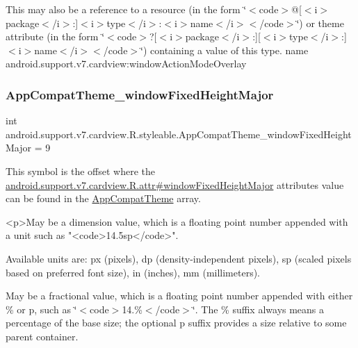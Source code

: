 This may also be a reference to a resource (in the form \char`\"{}$<$code$>$@\mbox{[}$<$i$>$package$<$/i$>$\+:\mbox{]}$<$i$>$type$<$/i$>$\+:$<$i$>$name$<$/i$>$$<$/code$>$\char`\"{}) or theme attribute (in the form \char`\"{}$<$code$>$?\mbox{[}$<$i$>$package$<$/i$>$\+:\mbox{]}\mbox{[}$<$i$>$type$<$/i$>$\+:\mbox{]}$<$i$>$name$<$/i$>$$<$/code$>$\char`\"{}) containing a value of this type.  name android.\+support.\+v7.\+cardview\+:window\+Action\+Mode\+Overlay \mbox{\label{classandroid_1_1support_1_1v7_1_1cardview_1_1R_1_1styleable_af7d8d8ae32e20793c811cd2892bd854b}} 
\subsubsection{\texorpdfstring{App\+Compat\+Theme\+\_\+window\+Fixed\+Height\+Major}{AppCompatTheme\_windowFixedHeightMajor}}
{\footnotesize\ttfamily int android.\+support.\+v7.\+cardview.\+R.\+styleable.\+App\+Compat\+Theme\+\_\+window\+Fixed\+Height\+Major = 9\hspace{0.3cm}{\ttfamily [static]}}

This symbol is the offset where the \hyperlink{classandroid_1_1support_1_1v7_1_1cardview_1_1R_1_1attr_a60358e25c5caa9936e1ff906a18e2212}{android.\+support.\+v7.\+cardview.\+R.\+attr\#window\+Fixed\+Height\+Major} attribute\textquotesingle{}s value can be found in the \hyperlink{classandroid_1_1support_1_1v7_1_1cardview_1_1R_1_1styleable_a52e6f69f954ecc2622d72c0b4d298938}{App\+Compat\+Theme} array.

\begin{DoxyVerb}      <p>May be a dimension value, which is a floating point number appended with a unit such as "<code>14.5sp</code>".
\end{DoxyVerb}
 Available units are\+: px (pixels), dp (density-\/independent pixels), sp (scaled pixels based on preferred font size), in (inches), mm (millimeters). 

May be a fractional value, which is a floating point number appended with either \% or p, such as \char`\"{}$<$code$>$14.\%$<$/code$>$\char`\"{}. The \% suffix always means a percentage of the base size; the optional p suffix provides a size relative to some parent container. 

